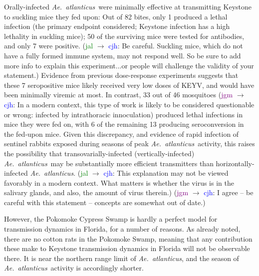 \documentclass[12pt]{article}
\newcommand{\atl}{\textit{Ae.\ atlanticus}}
\newcommand{\cjh}{\textcolor{blue}{cjh}}
\newcommand{\jal}{\textcolor{green}{jal}}
\newcommand{\jgm}{\textcolor{purple}{jgm}}
\newcommand{\msg}[3]{(#1 $\rightarrow$ #2: #3)}
\newcommand{\mcc}[1]{\msg\cjh\cjh{#1}}
\newcommand{\mjc}[1]{\msg\jal\cjh{#1}}
\newcommand{\mgc}[1]{\msg\jgm\cjh{#1}}
\begin{document}
                Orally-infected \atl\ were minimally effective at transmitting Keystone to suckling mice they fed upon: Out of 82 bites, only 1 produced a lethal infection (the primary endpoint considered; Keystone infection has a high lethality in suckling mice); 50 of the surviving mice were tested for antibodies, and only 7 were positive.\cite{watts1988maintenance} \mjc{Be careful. Suckling mice, which do not have a fully formed immune system, may not respond well.   So be sure to add more info to explain this experiment...or people will challenge the validity of your statement.} Evidence from previous dose-response experiments suggests that these 7 seropositive mice likely received very low doses of KEYV, and would have been minimally viremic at most. In contrast, 33 out of 46 mosquitoes \mgc{In a modern context, this type of work is likely to be considered questionable or wrong: infected by intrathoracic innoculation} produced lethal infections in mice they were fed on\cite{watts1988maintenance}, with 6 of the remaining 13 producing seroconversion in the fed-upon mice. Given this discrepancy, and evidence of rapid infection of sentinel rabbits exposed during seasons of peak \atl\ activity\cite{jennings1968california,leduc1978natural}, this raises the possibility that transovarially-infected (vertically-infected) \atl\ may be substantially more efficient transmitters than horizontally-infected \atl. \mjc{This explanation may not be viewed favorably in a modern context. What matters is whether the virus is in the salivary glands, and also, the amount of virus therein.} \mgc{I agree – be careful with this statement – concepts are somewhat out of date.}
            

                However, the Pokomoke Cypress Swamp is hardly a perfect model for transmission dynamics in Florida, for a number of reasons. As already noted, there are no cotton rats in the Pokomoke Swamp, meaning that any contribution these make to Keystone transmission dynamics in Florida will not be observable there. It is near the northern range limit of \atl, and the season of \atl\ activity is accordingly shorter.
\end{document}
